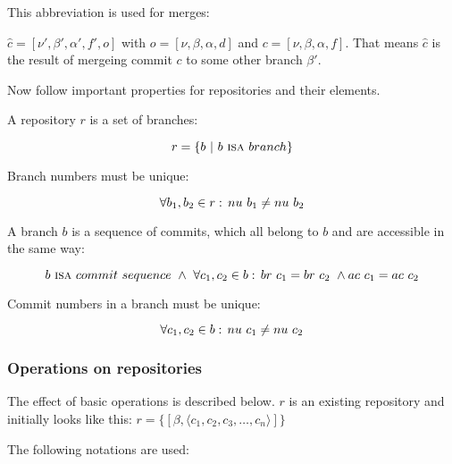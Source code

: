 \documentclass[fleqn, 10pt, a4paper]{article}
\begin{document}
This abbreviation is used for merges:

$\hat c = [\nu', \beta', \alpha', f', o]$ with $o=[\nu, \beta, \alpha, d]$ and
$c=[\nu, \beta, \alpha, f]$. That means $\hat c$ is the result of mergeing
commit $c$ to some other branch $\beta'$.

Now follow important properties for repositories and their elements.

A repository $r$ is a set of branches:

\begin{displaymath}
r = \{b \ |\ b\ \mbox{\textsc{isa}}\ \mathnormal{branch}\}
\end{displaymath}

Branch numbers must be unique:

\begin{displaymath}
\forall b_1, b_2 \in r:\, \mathnormal{nu}\ b_1 \neq \mathnormal{nu}\ b_2
\end{displaymath}

A branch $b$ is a sequence of commits, which all belong to
$b$ and are accessible in the same way:

\begin{displaymath}
b\ \mbox{\textsc{isa}}\ \mathnormal{commit}\ \mathnormal{sequence}\ \wedge\
\forall c_1, c_2 \in b:\, \mathnormal{br}\ c_1 = \mathnormal{br}\ c_2\ \wedge
\mathnormal{ac}\ c_1 = \mathnormal{ac}\ c_2
\end{displaymath}

Commit numbers in a branch must be unique:

\begin{displaymath}
\forall c_1, c_2 \in b:\, \mathnormal{nu}\ c_1 \neq
\mathnormal{nu}\ c_2
\end{displaymath}

\subsubsection{Operations on repositories}

The effect of basic operations is described below. $r$ is an
existing repository and initially looks like this:
$r = \{[\beta, \langle c_1, c_2, c_3, \ldots, c_n\rangle]\}$

The following notations are used:
\end{document}
